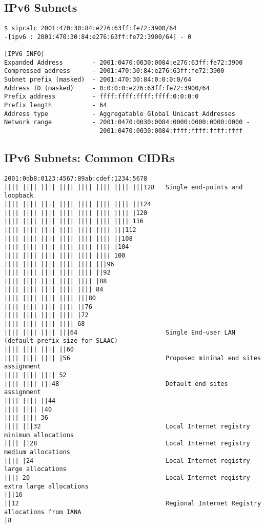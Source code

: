 \documentclass[xga]{xdvislides}
\begin{document}
\subsection{IPv6 Subnets}
\begin{verbatim}
$ sipcalc 2001:470:30:84:e276:63ff:fe72:3900/64
-[ipv6 : 2001:470:30:84:e276:63ff:fe72:3900/64] - 0

[IPV6 INFO]
Expanded Address        - 2001:0470:0030:0084:e276:63ff:fe72:3900
Compressed address      - 2001:470:30:84:e276:63ff:fe72:3900
Subnet prefix (masked)  - 2001:470:30:84:0:0:0:0/64
Address ID (masked)     - 0:0:0:0:e276:63ff:fe72:3900/64
Prefix address          - ffff:ffff:ffff:ffff:0:0:0:0
Prefix length           - 64
Address type            - Aggregatable Global Unicast Addresses
Network range           - 2001:0470:0030:0084:0000:0000:0000:0000 -
                          2001:0470:0030:0084:ffff:ffff:ffff:ffff

\end{verbatim}

\subsection{IPv6 Subnets: Common CIDRs}
\small
\begin{verbatim}
2001:0db8:0123:4567:89ab:cdef:1234:5678
|||| |||| |||| |||| |||| |||| |||| |||128   Single end-points and loopback
|||| |||| |||| |||| |||| |||| |||| ||124
|||| |||| |||| |||| |||| |||| |||| |120
|||| |||| |||| |||| |||| |||| |||| 116
|||| |||| |||| |||| |||| |||| |||112
|||| |||| |||| |||| |||| |||| ||108
|||| |||| |||| |||| |||| |||| |104
|||| |||| |||| |||| |||| |||| 100
|||| |||| |||| |||| |||| |||96
|||| |||| |||| |||| |||| ||92
|||| |||| |||| |||| |||| |88
|||| |||| |||| |||| |||| 84
|||| |||| |||| |||| |||80
|||| |||| |||| |||| ||76
|||| |||| |||| |||| |72
|||| |||| |||| |||| 68
|||| |||| |||| |||64                        Single End-user LAN (default prefix size for SLAAC)
|||| |||| |||| ||60
|||| |||| |||| |56                          Proposed minimal end sites assignment
|||| |||| |||| 52
|||| |||| |||48                             Default end sites assignment
|||| |||| ||44
|||| |||| |40
|||| |||| 36
|||| |||32                                  Local Internet registry minimum allocations
|||| ||28                                   Local Internet registry medium allocations
|||| |24                                    Local Internet registry large allocations
|||| 20                                     Local Internet registry extra large allocations
|||16
||12                                        Regional Internet Registry allocations from IANA
|8
\end{verbatim}
\Normalsize
%
\end{document}
